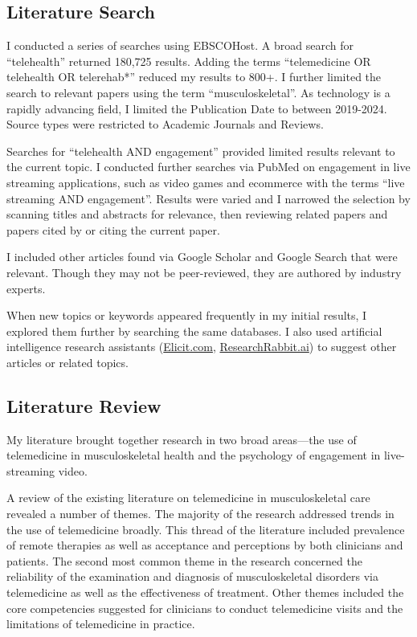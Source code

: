 \documentclass[utf8]{FrontiersinHarvard} %
\begin{document}
\subsection{Literature Search}

I conducted a series of searches using EBSCOHost. A broad search for ``telehealth'' returned 180,725 results. Adding the terms ``telemedicine OR telehealth OR telerehab*'' reduced my results to 800+. I further limited the search to relevant papers using the term ``musculoskeletal''. As technology is a rapidly advancing field, I limited the Publication Date to between 2019-2024. Source types were restricted to Academic Journals and Reviews.

Searches for ``telehealth AND engagement'' provided limited results relevant to the current topic. I conducted further searches via PubMed on engagement in live streaming applications, such as video games and ecommerce with the terms ``live streaming AND engagement''. Results were varied and I narrowed the selection by scanning titles and abstracts for relevance, then reviewing related papers and papers cited by or citing the current paper.

I included other articles found via Google Scholar and Google Search that were relevant. Though they may not be peer-reviewed, they are authored by industry experts.

When new topics or keywords appeared frequently in my initial results, I explored them further by searching the same databases. I also used artificial intelligence research assistants (\href{http://Elicit.com}{Elicit.com}, \href{https://researchrabbit.ai}{ResearchRabbit.ai}) to suggest other articles or related topics.

\subsection{Literature Review}

My literature brought together research in two broad areas---the use of telemedicine in musculoskeletal health and the psychology of engagement in live-streaming video.

A review of the existing literature on telemedicine in musculoskeletal care revealed a number of themes. The majority of the research addressed trends in the use of telemedicine broadly. This thread of the literature included prevalence of remote therapies as well as acceptance and perceptions by both clinicians and patients. The second most common theme in the research concerned the reliability of the examination and diagnosis of musculoskeletal disorders via telemedicine as well as the effectiveness of treatment. Other themes included the core competencies suggested for clinicians to conduct telemedicine visits and the limitations of telemedicine in practice.
\end{document}
